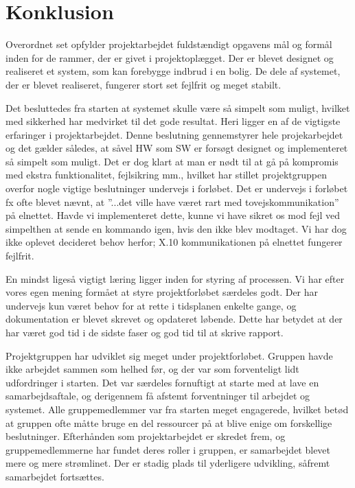 \chapter{Konklusion}
Overordnet set opfylder projektarbejdet fuldstændigt opgavens mål og formål inden for de rammer, der er givet i projektoplægget. 
Der er blevet designet og realiseret et system, som kan forebygge indbrud i en bolig. 
De dele af systemet, der er blevet realiseret, fungerer stort set fejlfrit og meget stabilt. 

Det besluttedes fra starten at systemet skulle være så simpelt som muligt, hvilket med sikkerhed har medvirket til det gode resultat. 
Heri ligger en af de vigtigste erfaringer i projektarbejdet. 
Denne beslutning gennemstyrer hele projekarbejdet og det gælder således, at såvel HW som SW er forsøgt designet og implementeret så simpelt som muligt.
Det er dog klart at man er nødt til at gå på kompromis med ekstra funktionalitet, fejlsikring mm., hvilket har stillet projektgruppen overfor nogle vigtige beslutninger undervejs i forløbet. 
Det er undervejs i forløbet fx ofte blevet nævnt, at ''...det ville have været rart med tovejskommunikation'' på elnettet. 
Havde vi implementeret dette, kunne vi have sikret os mod fejl ved simpelthen at sende en kommando igen, hvis den ikke blev modtaget. 
Vi har dog ikke oplevet decideret behov herfor; X.10 kommunikationen på elnettet fungerer fejlfrit.

En mindst ligeså vigtigt læring ligger inden for styring af processen. 
Vi har efter vores egen mening formået at styre projektforløbet særdeles godt. 
Der har undervejs kun været behov for at rette i tidsplanen enkelte gange, og dokumentation er blevet skrevet og opdateret løbende. 
Dette har betydet at der har været god tid i de sidste faser og god tid til at skrive rapport. 

Projektgruppen har udviklet sig meget under projektforløbet. 
Gruppen havde ikke arbejdet sammen som helhed før, og der var som forventeligt lidt udfordringer i starten.
Det var særdeles fornuftigt at starte med at lave en samarbejdsaftale, og derigennem få afstemt forventninger til arbejdet og systemet.  
Alle gruppemedlemmer var fra starten meget engagerede, hvilket betød at gruppen ofte måtte bruge en del ressourcer på at blive enige om forskellige beslutninger. 
Efterhånden som projektarbejdet er skredet frem, og gruppemedlemmerne har fundet deres roller i gruppen, er samarbejdet blevet mere og mere strømlinet. 
Der er stadig plads til yderligere udvikling, såfremt samarbejdet fortsættes.

\clearpage